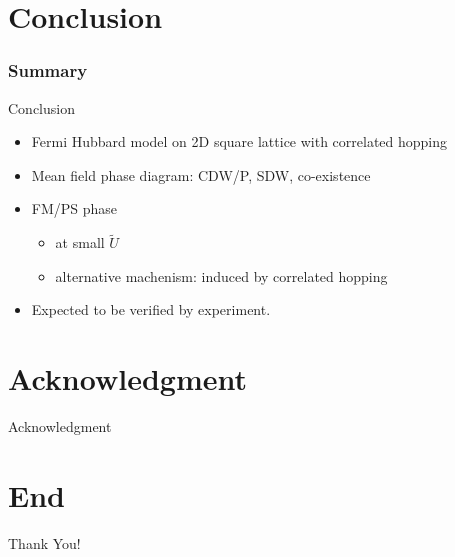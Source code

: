 \documentclass[]{beamer}
\begin{document}
\section{Conclusion}
\begin{frame}\frametitle{Summary}
\begin{block}{Conclusion}
\begin{itemize}
\pause
\item Fermi Hubbard model on 2D square lattice with correlated hopping
\pause
\item Mean field phase diagram: CDW/P, SDW, co-existence
\pause
\item FM/PS phase
    \begin{itemize}
\pause
    \item at small $\tilde{U}$
\pause
    \item alternative machenism: induced by correlated hopping
    \end{itemize}
\pause
\item Expected to be verified by experiment.
\end{itemize}
\end{block}
\end{frame}


\section*{Acknowledgment}
\begin{frame}
\begin{block}{Acknowledgment}
\begin{figure}[!htb]
    \centering
\end{figure}
\end{block}
\end{frame}


\section*{End}
\begin{frame}
\centering
    \Huge
    Thank You!
\end{frame}
\end{document}
